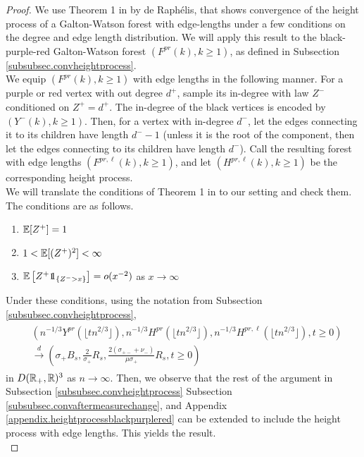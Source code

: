 \begin{proof}
We use Theorem 1 in \cite{deraphelisScalingLimitMultitype2017} by de Raphélis, that shows convergence of the height process of a Galton-Watson forest with edge-lengths under a few conditions on the degree and edge length distribution. We will apply this result to the black-purple-red Galton-Watson forest $(F^{pr}(k),k\geq 1)$, as defined in Subsection \ref{subsubsec.convheightprocess}. \\
We equip $(F^{pr}(k),k\geq 1)$ with edge lengths in the following manner. For a purple or red vertex with out degree $d^+$, sample its in-degree with law $Z^-$ conditioned on $Z^+=d^+$. The in-degree of the black vertices is encoded by $(Y^{-}(k),k\geq 1)$.  Then, for a vertex with in-degree $d^-$, let the edges connecting it to its children have length $d^--1$ (unless it is the root of the component, then let the edges connecting to its children have length $d^-$). Call the resulting forest with edge lengths $(F^{pr,\ell}(k),k\geq 1)$, and let $(H^{pr,\ell}(k),k\geq 1)$ be the corresponding height process.\\
We will translate the conditions of Theorem 1 in \cite{deraphelisScalingLimitMultitype2017} to our setting and check them. The conditions are as follows.
\begin{enumerate}
    \item ${\mathbb E}[Z^+]=1$
    \item $1<{\mathbb E}[(Z^+)^2]<\infty$
    \item $\E\left[Z^+\one_{\{Z^->x\}}\right]=o(x^{-2})$ as $x\to \infty$
\end{enumerate}
Under these conditions, using the notation from Subsection \ref{subsubsec.convheightprocess},
\begin{align}\begin{split}\label{eq.convmodifiedheightprocess}
&\left(n^{-1/3}Y^{pr}\left(\lfloor t n^{2/3}\rfloor \right),n^{-1/3}H^{pr}\left(\lfloor t n^{2/3}\rfloor \right), n^{-1/3}H^{pr,\ell}\left(\lfloor t n^{2/3}\rfloor \right),t\geq 0\right)\\
&\overset{d}{\to}\left(\sigma_+ B_s, \frac{2}{\sigma_+}R_s, \frac{2(\sigma_{+-}+\nu_-)}{\mu\sigma_+}R_s,t\geq 0\right)
\end{split}\end{align}
in $D({\mathbb R}_+,{\mathbb R})^3$ as $n\to \infty$. 
Then, we observe that the rest of the argument in Subsection \ref{subsubsec.convheightprocess} Subsection \ref{subsubsec.convaftermeasurechange}, and Appendix \ref{appendix.heightprocessblackpurplered} can be extended to include the height process with edge lengths. This yields the result.\\

\end{proof}
